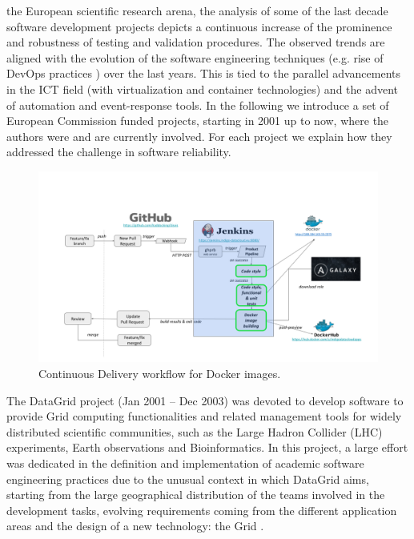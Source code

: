 \documentclass[journal]{IEEEtran}
\begin{document}
 the European scientific research arena, the analysis of some of the last decade software development projects depicts a continuous increase of the prominence and robustness of testing and validation procedures. The observed trends are aligned with the evolution of the software engineering techniques (e.g. rise of DevOps practices \cite{devops}) over the last years. This is tied to the parallel advancements in the ICT field (with virtualization and container technologies) and the advent of automation and event-response tools. In the following we introduce a set of European Commission funded projects, starting in 2001 up to now, where the authors were and are currently involved. For each project we explain how they addressed the challenge in software reliability.

\begin{figure}
\centering
\includegraphics[width=\textwidth]{images/devops.png}
\caption{Continuous Delivery workflow for Docker images.}
\label{fig:fig_CD}
\end{figure}

The DataGrid \cite{cordis:datagrid} project (Jan 2001 -- Dec 2003) was devoted to develop software to provide Grid computing functionalities and related management tools for widely distributed scientific communities, such as the Large Hadron Collider (LHC) experiments, Earth observations and Bioinformatics. In this project, a large effort was dedicated in the definition and implementation of academic software engineering practices due to the unusual context in which DataGrid aims, starting from the large geographical distribution of the teams involved in the development tasks, evolving requirements coming from the different application areas and the design of a new technology: the Grid \cite{datagrid}.
\end{document}
